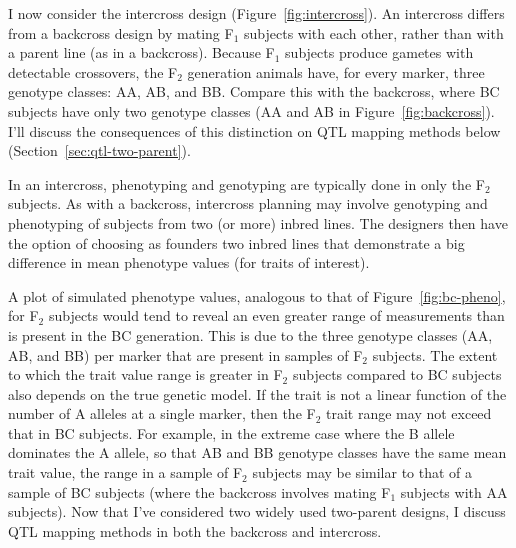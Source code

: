 \documentclass[oneside]{book}\usepackage[]{graphicx}\usepackage[]{color}
\begin{document}
I now consider the intercross design (Figure~\ref{fig:intercross}).
An intercross differs from a backcross design by mating F$_1$ subjects with each other,
rather than with a parent line (as in a backcross). Because F$_1$ subjects
produce gametes with detectable crossovers, the F$_2$ generation animals have,
for every marker, three genotype classes: AA, AB, and BB. Compare this with
the backcross, where BC subjects have only two genotype classes (AA and
AB in Figure~\ref{fig:backcross}).
I'll discuss the consequences of this distinction on QTL mapping methods below
(Section~\ref{sec:qtl-two-parent}).

In an intercross, phenotyping and genotyping are typically done in only the F$_2$ subjects.
As with a backcross, intercross planning may involve genotyping and phenotyping of
subjects from two (or more) inbred lines. The designers then have the option of
choosing as founders two inbred lines that demonstrate a big difference in
mean phenotype values (for traits of interest). 

A plot of simulated phenotype values, analogous to that of Figure~\ref{fig:bc-pheno}, for 
F$_2$ subjects would tend to reveal an even greater range of measurements than is present in 
the BC generation. This is due to the three genotype classes (AA, AB, and BB) per marker that 
are present in samples of F$_2$ subjects. The extent to which the trait value range is greater
in F$_2$ subjects compared to BC subjects also depends on the true genetic model.
If the trait is not a linear function of the number of A alleles at a single marker, then the 
F$_2$ trait range may not exceed that
in BC subjects. For example, in the extreme case where the B allele dominates the A allele,
so that AB and BB genotype classes have the same mean trait value,
the range in a sample of F$_2$ subjects may
be similar to that of a sample of BC subjects (where the backcross involves mating F$_1$
subjects with AA subjects). Now that I've considered two widely used two-parent designs, I discuss QTL mapping methods in both the backcross and intercross.
\end{document}

